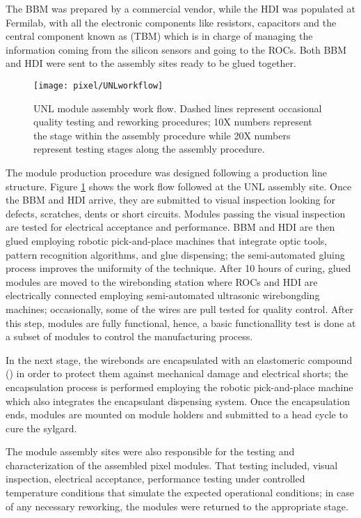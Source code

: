 The BBM was prepared by a commercial vendor, while the HDI was populated at Fermilab, with all the electronic components like resistors, capacitors and the central component known as  (TBM) which is in charge of managing the information coming from the silicon sensors and going to the ROCs. Both BBM and HDI were sent to the assembly sites ready to be glued together.  


\begin{figure}[!h]
  \centering
  \texttt{[image: pixel/UNLworkflow]}
  \caption[UNL module assembly work flow.]{UNL module assembly work flow. Dashed lines represent occasional quality testing and reworking procedures; 10X numbers represent the stage within the assembly procedure while 20X numbers represent testing stages along the assembly procedure.}\label{fig:unlworkflow}
\end{figure}


The module production procedure was designed following a production line structure. Figure \ref{fig:unlworkflow} shows the work flow followed at the UNL assembly site. Once the BBM and HDI arrive, they are submitted to visual inspection looking for defects, scratches, dents or short circuits. Modules passing the visual inspection are tested for electrical acceptance and performance. BBM and HDI are then glued employing robotic pick-and-place machines that integrate optic tools, pattern recognition algorithms, and glue dispensing; the semi-automated gluing process improves the uniformity of the technique. After 10 hours of curing, glued modules are moved to the wirebonding station where ROCs and HDI are electrically connected employing semi-automated ultrasonic wirebongding machines; occasionally, some of the wires are pull tested for quality control. After this step, modules are fully functional, hence, a basic functionallity test is done at a subset of modules to control the manufacturing process.    

In the next stage, the wirebonds are encapsulated with an elastomeric compound () in order to protect them against mechanical damage and electrical shorts; the encapsulation process is performed employing the robotic pick-and-place machine which also integrates the encapsulant dispensing system. Once the encapsulation ends, modules are mounted on module holders and submitted to a head cycle to cure the sylgard.    

The module assembly sites were also responsible for the testing and characterization of the assembled pixel modules. That testing included, visual inspection, electrical acceptance, performance testing under controlled temperature conditions that simulate the expected operational conditions; in case of any necessary reworking, the modules were returned to the appropriate stage.

